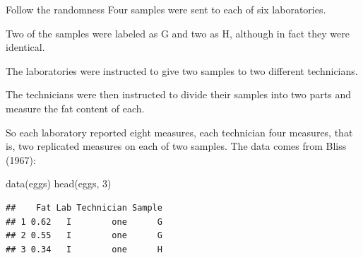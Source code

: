 \documentclass[
  ignorenonframetext,
]{beamer}
\newenvironment{Shaded}{\begin{snugshade}}{\end{snugshade}}
\newcommand{\DecValTok}[1]{\textcolor[rgb]{0.00,0.00,0.81}{#1}}
\newcommand{\FunctionTok}[1]{\textcolor[rgb]{0.00,0.00,0.00}{#1}}
\newcommand{\NormalTok}[1]{#1}
\begin{document}
\begin{frame}[fragile]{Follow the randomness}
\protect\hypertarget{follow-the-randomness}{}
Four samples were sent to each of six laboratories.

Two of the samples were labeled as G and two as H, although in fact they
were identical.

The laboratories were instructed to give two samples to two different
technicians.

The technicians were then instructed to divide their samples into two
parts and measure the fat content of each.

So each laboratory reported eight measures, each technician four
measures, that is, two replicated measures on each of two samples. The
data comes from Bliss (1967):

\vspace{12pt}
\tiny

\begin{Shaded}
\begin{Highlighting}[]
\FunctionTok{data}\NormalTok{(eggs)}
\FunctionTok{head}\NormalTok{(eggs, }\DecValTok{3}\NormalTok{)}
\end{Highlighting}
\end{Shaded}

\begin{verbatim}
##    Fat Lab Technician Sample
## 1 0.62   I        one      G
## 2 0.55   I        one      G
## 3 0.34   I        one      H
\end{verbatim}
\end{frame}
\end{document}
